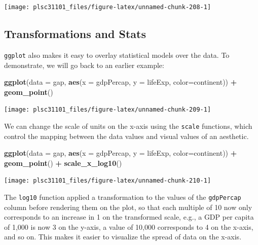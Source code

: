 \documentclass[
]{book}
\newenvironment{Shaded}{\begin{snugshade}}{\end{snugshade}}
\newcommand{\DataTypeTok}[1]{\textcolor[rgb]{0.13,0.29,0.53}{#1}}
\newcommand{\KeywordTok}[1]{\textcolor[rgb]{0.13,0.29,0.53}{\textbf{#1}}}
\newcommand{\NormalTok}[1]{#1}
\newcommand{\OperatorTok}[1]{\textcolor[rgb]{0.81,0.36,0.00}{\textbf{#1}}}
\newcommand{\StringTok}[1]{\textcolor[rgb]{0.31,0.60,0.02}{#1}}
\begin{document}
\begin{center}\texttt{[image: plsc31101\_files/figure-latex/unnamed-chunk-208-1]} \end{center}

\hypertarget{transformations-and-stats}{%
\subsection{Transformations and Stats}\label{transformations-and-stats}}

\texttt{ggplot} also makes it easy to overlay statistical models over the data. To demonstrate, we will go back to an earlier example:

\begin{Shaded}
\begin{Highlighting}[]
\KeywordTok{ggplot}\NormalTok{(}\DataTypeTok{data =}\NormalTok{ gap, }\KeywordTok{aes}\NormalTok{(}\DataTypeTok{x =}\NormalTok{ gdpPercap, }\DataTypeTok{y =}\NormalTok{ lifeExp, }\DataTypeTok{color=}\NormalTok{continent)) }\OperatorTok{+}\StringTok{ }
\StringTok{  }\KeywordTok{geom_point}\NormalTok{()}
\end{Highlighting}
\end{Shaded}

\begin{center}\texttt{[image: plsc31101\_files/figure-latex/unnamed-chunk-209-1]} \end{center}

We can change the scale of units on the x-axis using the \texttt{scale} functions, which control the mapping between the data values and visual values of an aesthetic.

\begin{Shaded}
\begin{Highlighting}[]
\KeywordTok{ggplot}\NormalTok{(}\DataTypeTok{data =}\NormalTok{ gap, }\KeywordTok{aes}\NormalTok{(}\DataTypeTok{x =}\NormalTok{ gdpPercap, }\DataTypeTok{y =}\NormalTok{ lifeExp, }\DataTypeTok{color=}\NormalTok{continent)) }\OperatorTok{+}\StringTok{ }
\StringTok{  }\KeywordTok{geom_point}\NormalTok{() }\OperatorTok{+}\StringTok{ }
\StringTok{  }\KeywordTok{scale_x_log10}\NormalTok{()}
\end{Highlighting}
\end{Shaded}

\begin{center}\texttt{[image: plsc31101\_files/figure-latex/unnamed-chunk-210-1]} \end{center}

The \texttt{log10} function applied a transformation to the values of the \texttt{gdpPercap} column before rendering them on the plot, so that each multiple of 10 now only corresponds to an increase in 1 on the transformed scale, e.g., a GDP per capita of 1,000 is now 3 on the y-axis, a value of 10,000 corresponds to 4 on the x-axis, and so on. This makes it easier to visualize the spread of data on the x-axis.
\end{document}
